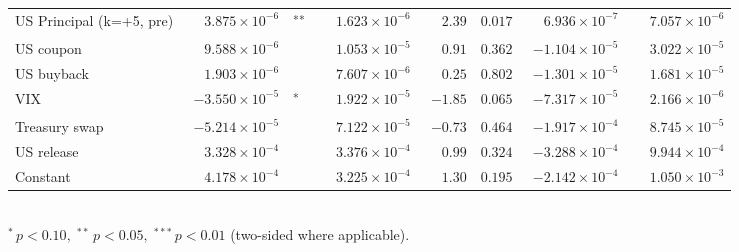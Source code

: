 \documentclass[10pt]{article}
\begin{document}
\begin{tabular}{@{}l|r@{}l rrr rr@{}}
US Principal (k=+5, pre) & $\phantom{-}3.875\!\times\!10^{-6}$ & \textsuperscript{**} & $\phantom{-}1.623\!\times\!10^{-6}$ & $\phantom{-}2.39$ & $0.017$ & $\phantom{-}6.936\!\times\!10^{-7}$ & $\phantom{-}7.057\!\times\!10^{-6}$ \\
\addlinespace[0.3em]
US coupon & $\phantom{-}9.588\!\times\!10^{-6}$ & \textsuperscript{} & $\phantom{-}1.053\!\times\!10^{-5}$ & $\phantom{-}0.91$ & $0.362$ & $-1.104\!\times\!10^{-5}$ & $\phantom{-}3.022\!\times\!10^{-5}$ \\
US buyback & $\phantom{-}1.903\!\times\!10^{-6}$ & \textsuperscript{} & $\phantom{-}7.607\!\times\!10^{-6}$ & $\phantom{-}0.25$ & $0.802$ & $-1.301\!\times\!10^{-5}$ & $\phantom{-}1.681\!\times\!10^{-5}$ \\
VIX & $-3.550\!\times\!10^{-5}$ & \textsuperscript{*} & $\phantom{-}1.922\!\times\!10^{-5}$ & $-1.85$ & $0.065$ & $-7.317\!\times\!10^{-5}$ & $\phantom{-}2.166\!\times\!10^{-6}$ \\
Treasury swap & $-5.214\!\times\!10^{-5}$ & \textsuperscript{} & $\phantom{-}7.122\!\times\!10^{-5}$ & $-0.73$ & $0.464$ & $-1.917\!\times\!10^{-4}$ & $\phantom{-}8.745\!\times\!10^{-5}$ \\
US release & $\phantom{-}3.328\!\times\!10^{-4}$ & \textsuperscript{} & $\phantom{-}3.376\!\times\!10^{-4}$ & $\phantom{-}0.99$ & $0.324$ & $-3.288\!\times\!10^{-4}$ & $\phantom{-}9.944\!\times\!10^{-4}$ \\
\addlinespace[0.3em]
Constant & $\phantom{-}4.178\!\times\!10^{-4}$ & \textsuperscript{} & $\phantom{-}3.225\!\times\!10^{-4}$ & $\phantom{-}1.30$ & $0.195$ & $-2.142\!\times\!10^{-4}$ & $\phantom{-}1.050\!\times\!10^{-3}$ \\
\hline
\end{tabular}
\\[0.2em]
{\footnotesize $^{*}\,p<0.10,\;^{**}\,p<0.05,\;^{***}\,p<0.01$ (two-sided where applicable).}
\vspace{0.9em}
\end{document}
